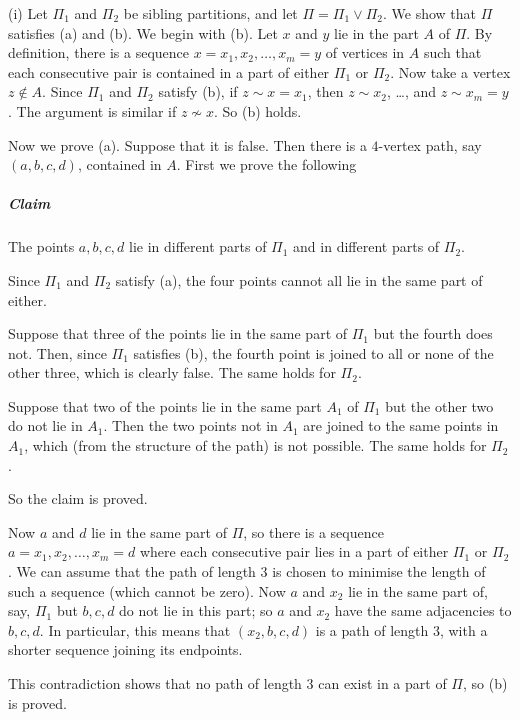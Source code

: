 \documentclass[12pt]{article}
\newenvironment{proof}{\prepf\rm}{\endprepf}
\begin{document}
\begin{proof} (i) Let $\Pi_1$ and $\Pi_2$ be sibling partitions, and let
$\Pi=\Pi_1\vee\Pi_2$. We show that $\Pi$ satisfies (a) and (b). We begin
with (b). Let $x$ and $y$ lie in the part $A$ of $\Pi$. By definition, there
is a sequence $x=x_1,x_2,\ldots,x_m=y$ of vertices in $A$ such that each
consecutive pair is contained in a part of either $\Pi_1$ or $\Pi_2$. Now
take a vertex $z\notin A$. Since $\Pi_1$ and $\Pi_2$ satisfy (b), if
$z\sim x=x_1$, then $z\sim x_2$, \dots, and $z\sim x_m=y$. The argument is
similar if $z\not\sim x$. So (b) holds.

\smallskip

Now we prove (a). Suppose that it is false. Then there is a $4$-vertex path,
say $(a,b,c,d)$, contained in $A$. First we prove the following

\subparagraph{Claim} The points $a,b,c,d$ lie in different parts of $\Pi_1$ and
in different parts of $\Pi_2$.

Since $\Pi_1$ and $\Pi_2$ satisfy (a), the four points cannot all lie in the
same part of either.

Suppose that three of the points lie in the same part of $\Pi_1$ but the fourth
does not. Then, since $\Pi_1$ satisfies (b), the fourth point is joined to all
or none of the other three, which is clearly false. The same holds for $\Pi_2$.

Suppose that two of the points lie in the same part $A_1$ of $\Pi_1$ but the
other two do not lie in $A_1$. Then the two points not in $A_1$ are joined to
the same points in $A_1$, which (from the structure of the path) is not
possible. The same holds for $\Pi_2$. 

So the claim is proved.

\smallskip

Now $a$ and $d$ lie in the same part of $\Pi$, so there is a sequence
$a=x_1,x_2,\ldots,x_m=d$ where each consecutive pair lies in a part of
either $\Pi_1$ or $\Pi_2$. We can assume that the path of length $3$ is
chosen to minimise the length of such a sequence (which cannot be zero).
Now $a$ and $x_2$ lie in the same part of, say, $\Pi_1$ but $b,c,d$ do not
lie in this part; so $a$ and $x_2$ have the same adjacencies to $b,c,d$.
In particular, this means that $(x_2,b,c,d)$ is a path of length $3$, with
a shorter sequence joining its endpoints.

This contradiction shows that no path of length $3$ can exist in a part of
$\Pi$, so (b) is proved.

\medskip


\end{proof}
\end{document}
